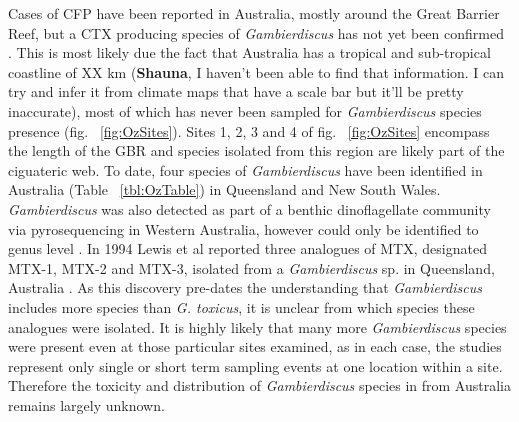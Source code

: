 \documentclass[12pt]{article}
\begin{document}
 
Cases of CFP have been reported in Australia, mostly around the Great Barrier Reef, but a CTX producing species of \emph{Gambierdiscus} has not yet been confirmed \citep{lewis2006ciguatera}. This is most likely due the fact that Australia has a tropical and sub-tropical coastline of  XX km (\textbf{Shauna}, I haven't been able to find that information. I can try and infer it from climate maps that have a scale bar but it'll be pretty inaccurate), most of which has never been sampled for \textit{Gambierdiscus} species presence  (fig. ~\ref{fig:OzSites}). Sites 1, 2, 3 and 4 of fig. ~\ref{fig:OzSites} encompass the length of the GBR and species isolated from this region are likely part of the ciguateric web. To date, four species of \emph{Gambierdiscus} have been identified in Australia (Table ~\ref{tbl:OzTable}) in Queensland and New South Wales. \emph{Gambierdiscus} was also detected as part of a benthic dinoflagellate community via pyrosequencing in Western Australia, however could only be identified to genus level \citep{kohli2014cob}.
In 1994 Lewis et al reported three analogues of MTX, designated MTX-1, MTX-2 and MTX-3, isolated from a \emph{Gambierdiscus} sp. in Queensland, Australia \citep{holmes1994purification}. As this discovery pre-dates the understanding that \emph{Gambierdiscus} includes more species than \emph{G. toxicus}, it is unclear from which species these analogues were isolated.  
It is highly likely that many more \emph{Gambierdiscus} species were present even at those particular sites examined, as in each case, the studies represent only single or short term sampling events at one location within a site. Therefore the toxicity and distribution of \emph{Gambierdiscus} species in from Australia remains largely unknown. %
\end{document}
